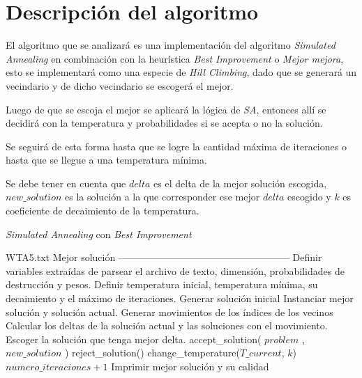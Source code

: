 \section{Descripción del algoritmo}

El algoritmo que se analizará es una implementación del algoritmo \textit{Simulated Annealing} en combinación con la heurística \textit{Best Improvement} o \textit{Mejor mejora}, esto se implementará como una especie de \textit{Hill Climbing}, dado que se generará un vecindario y de dicho vecindario se escogerá el mejor.

Luego de que se escoja el mejor se aplicará la lógica de \textit{SA}, entonces allí se decidirá con la temperatura y probabilidades si se acepta o no la solución.

Se seguirá de esta forma hasta que se logre la cantidad máxima de iteraciones o hasta que se llegue a una temperatura mínima.

Se debe tener en cuenta que $delta$ es el delta de la mejor solución escogida, $new\_solution$ es la solución a la que corresponder ese mejor $delta$ escogido y $k$ es coeficiente de decaimiento de la temperatura.

\begin{algorithm}[H]
\caption{\textit{Simulated Annealing} con \textit{Best Improvement}}
\label{alg:Framwork}  
  \begin{algorithmic}
    \Require WTA5.txt
    \Ensure Mejor solución
    \State -----------------------------------------------------
    \State Definir variables extraídas de parsear el archivo de texto, dimensión, probabilidades de destrucción y pesos.
    \State Definir temperatura inicial, temperatura mínima, su decaimiento y el máximo de iteraciones.
    \State Generar solución inicial
    \State Instanciar mejor solución y solución actual.
    \State Generar movimientos de los índices de los vecinos
    \State Calcular los deltas de la solución actual y las soluciones con el movimiento.
    \State Escoger la solución que tenga mejor delta.
    \State accept\_solution( $problem$ , $new\_solution$ )
    \Else
    \State reject\_solution()
    \EndIf
    \State change\_temperature($T\_current$, $k$)
    \State $numero\_iteraciones + 1$
    \EndWhile
    \State Imprimir mejor solución y su calidad
  \end{algorithmic}
\end{algorithm}

